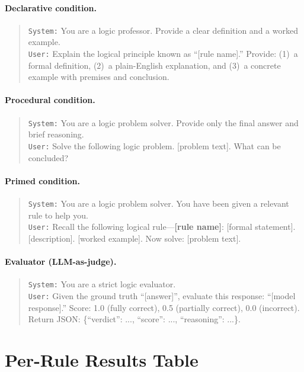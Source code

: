\documentclass{article}
\begin{document}
\paragraph{Declarative condition.}
\begin{quote}
\small
\texttt{System:} You are a logic professor. Provide a clear definition and a worked example.\\
\texttt{User:} Explain the logical principle known as ``[rule name].'' Provide: (1)~a formal definition, (2)~a plain-English explanation, and (3)~a concrete example with premises and conclusion.
\end{quote}

\paragraph{Procedural condition.}
\begin{quote}
\small
\texttt{System:} You are a logic problem solver. Provide only the final answer and brief reasoning.\\
\texttt{User:} Solve the following logic problem. [problem text]. What can be concluded?
\end{quote}

\paragraph{Primed condition.}
\begin{quote}
\small
\texttt{System:} You are a logic problem solver. You have been given a relevant rule to help you.\\
\texttt{User:} Recall the following logical rule---\textbf{[rule name]}: [formal statement]. [description]. [worked example]. Now solve: [problem text].
\end{quote}

\paragraph{Evaluator (LLM-as-judge).}
\begin{quote}
\small
\texttt{System:} You are a strict logic evaluator.\\
\texttt{User:} Given the ground truth ``[answer]'', evaluate this response: ``[model response].'' Score: 1.0 (fully correct), 0.5 (partially correct), 0.0 (incorrect). Return JSON: \{``verdict'': ..., ``score'': ..., ``reasoning'': ...\}.
\end{quote}

\section{Per-Rule Results Table}
\label{app:per_rule_full}
\end{document}
